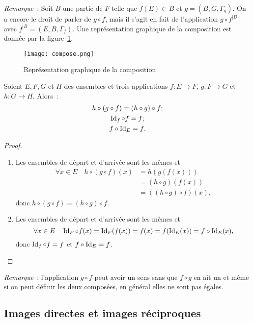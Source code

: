\emph{Remarque}~: Soit \(B\) une partie de \(F\) telle que \(f(E) \subset B\) et \(g=(B,G,\Gamma_g)\). On a encore le droit de parler de \(g \circ f\), mais il s'agit en fait de l'application \(g \circ f^{|B}\) avec \( f^{|B} =(E,B,\Gamma_f)\).
Une représentation graphique de la composition est donnée par la figure~\ref{chap3-fig:compose}.
%
\begin{figure}
  \centering
  \texttt{[image: compose.png]}
  \caption{Représentation graphique de la composition}
  \label{chap3-fig:compose}
\end{figure}
%
\begin{prop}
  Soient \(E,F,G\) et \(H\) des ensembles et trois applications \(f:E \longrightarrow F\), \(g:F \longrightarrow G\) et \(h:G \longrightarrow H\). Alors~:
  \begin{gather}
  h \circ (g \circ f)=(h \circ g) \circ f;\\
  \operatorname{Id}_f \circ f = f;\\
  f \circ \operatorname{Id}_E=f.
  \end{gather}
\end{prop}
\begin{proof}
  \begin{enumerate}
  \item Les ensembles de départ et d'arrivée sont les mêmes et 
    \begin{align}
      \forall x \in E \quad h \circ (g \circ f)(x) &=h(g(f(x))) \\ 
      &=(h \circ g)(f(x)) \\ 
      &=((h \circ g) \circ f)(x),
    \end{align}
    donc \(h \circ (g \circ f)=(h \circ g) \circ f\).
  \item Les ensembles de départ et d'arrivée sont les mêmes et 
    \begin{equation}
      \forall x \in E \quad \operatorname{Id}_F \circ f(x)=\operatorname{Id}_F(f(x))=f(x)=f(\operatorname{Id}_E(x))=f \circ \operatorname{Id}_E(x),
    \end{equation}
    donc \(\operatorname{Id}_f \circ f = f\) et \(f \circ \operatorname{Id}_E=f\).
  \end{enumerate}
\end{proof}

\emph{Remarque}~: l'application \(g \circ f\) peut avoir un sens sans que \(f \circ g\) en ait un et même si on peut définir les deux composées, en général elles ne sont pas égales.
%
\subsection{Images directes et images réciproques}
\label{chap3-subsec:imagesdirecteetrec}
